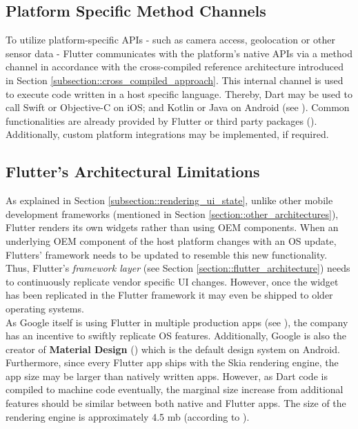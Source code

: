 \subsection{Platform Specific Method Channels} \label{subsection::method_channels}
To utilize platform-specific APIs - such as camera access, geolocation or other sensor data - Flutter communicates with the platform's native APIs via 
a method channel in accordance with the cross-compiled reference architecture introduced in Section \ref{subsection::cross_compiled_approach}. 
This internal channel is used to execute code written in a host specific language. Thereby, Dart may be used to call Swift or Objective-C on iOS; and Kotlin or Java on Android (see \cite{PlatformChannel2021}).
Common functionalities are already provided by Flutter or third party packages (\cite{PubDev2021}). Additionally, custom platform integrations may be 
implemented, if required.

\subsection{Flutter's Architectural Limitations}
As explained in Section \ref{subsection::rendering_ui_state}, unlike other mobile development frameworks (mentioned in Section \ref{section::other_architectures}), Flutter renders its own widgets rather than using OEM components. 
When an underlying OEM component of the host platform changes with an OS update, Flutters' framework needs to be updated to resemble this new 
functionality. 
Thus, Flutter's \textit{framework layer} (see Section \ref{section::flutter_architecture}) needs to continuously replicate vendor specific UI changes.
However, once the widget has been replicated in the Flutter framework it may even be shipped to older operating systems.\\
As Google itself is using Flutter in multiple production apps (see \cite{FlutterShowcase2021}), the company has an incentive to swiftly replicate OS features.
Additionally, Google is also the creator of \textbf{Material Design} (\cite{Google2021}) which is the default design system on Android.\\
Furthermore, since every Flutter app ships with the Skia rendering engine, the app size may be larger than natively written apps.
However, as Dart code is compiled to machine code eventually, the marginal size increase from additional features should be similar between both native 
and Flutter apps.
The size of the rendering engine is approximately 4.5 mb (according to \cite{FlutterFAQ2021}).